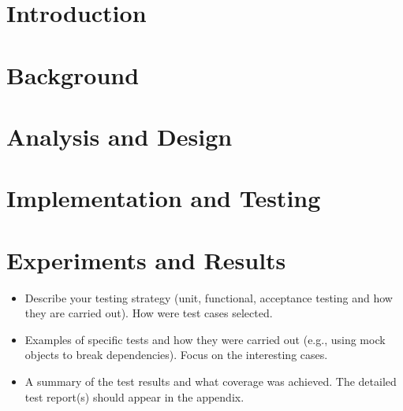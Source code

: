 \documentclass[ openright,titlepage,numbers=noenddot,headinclude,%
                footinclude=true,BCOR=5mm,paper=a4,fontsize=12pt,a4paper,english%
                ]{scrreprt}
\begin{document}




\pagestyle{scrheadings}

\chapter{Introduction}
\label{Chapters/Introduction}






\chapter{Background}




\chapter{Analysis and Design}
\label{Chapters/Analysis-and-Design}






\chapter{Implementation and Testing}
\label{Chapters/Implementation}










\chapter{Experiments and Results}
\label{Chapters/Testing-and-Validation}

\begin{itemize}
\item Describe your testing strategy (unit, functional, acceptance testing
and how they are carried out). How were test cases selected.
\item Examples of specific tests and how they were carried out (e.g., using mock objects to break dependencies). Focus on the interesting cases.
\item A summary of the test results and what coverage was achieved. The detailed test report(s) should appear in the appendix.
\end{itemize}
\end{document}
